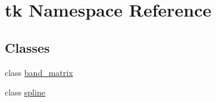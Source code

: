 \hypertarget{namespacetk}{}\section{tk Namespace Reference}
\label{namespacetk}
\subsection*{Classes}
\begin{DoxyCompactItemize}
\item 
class \hyperlink{classtk_1_1band__matrix}{band\+\_\+matrix}
\item 
class \hyperlink{classtk_1_1spline}{spline}
\end{DoxyCompactItemize}
